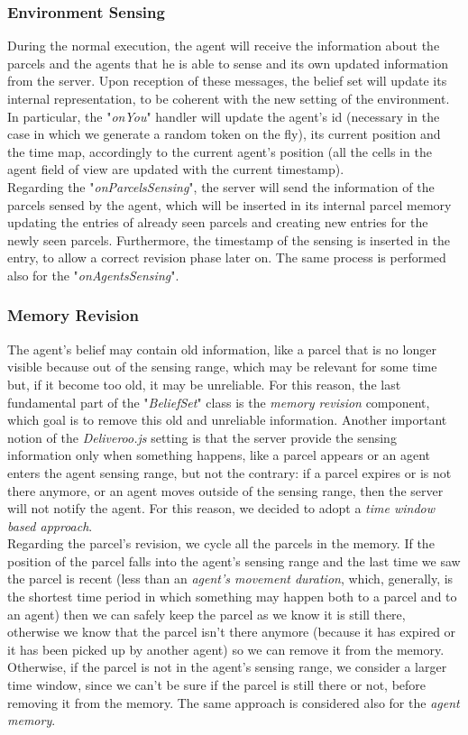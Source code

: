         \subsubsection{Environment Sensing}
            During the normal execution, the agent will receive the information about the parcels and the agents that he is able to sense and its own updated information from the server. Upon reception of these messages, the belief set will update its internal representation, to be coherent with the new setting of the environment.  In particular, the "\textit{onYou}" handler will update the agent's id (necessary in the case in which we generate a random token on the fly), its current position and the time map, accordingly to the current agent's position (all the cells in the agent field of view are updated with the current timestamp).
            \medskip\\
            Regarding the "\textit{onParcelsSensing}", the server will send the information of the parcels sensed by the agent, which will be inserted in its internal parcel memory updating the entries of already seen parcels and creating new entries for the newly seen parcels. Furthermore, the timestamp of the sensing is inserted in the entry, to allow a correct revision phase later on. The same process is performed also for the "\textit{onAgentsSensing}".

        \subsubsection{Memory Revision}
            The agent's belief may contain old information, like a parcel that is no longer visible because out of the sensing range, which may be relevant for some time but, if it become too old, it may be unreliable. For this reason, the last fundamental part of the "\textit{BeliefSet}" class is the \textit{memory revision} component, which goal is to remove this old and unreliable information. Another important notion of the \textit{Deliveroo.js} setting is that the server provide the sensing information only when something happens, like a parcel appears or an agent enters the agent sensing range, but not the contrary: if a parcel expires or is not there anymore, or an agent moves outside of the sensing range, then the server will not notify the agent. For this reason, we decided to adopt a \textit{time window based approach}.
            \medskip\\
            Regarding the parcel's revision, we cycle all the parcels in the memory. If the position of the parcel falls into the agent's sensing range and the last time we saw the parcel is recent (less than an \textit{agent's movement duration}, which, generally, is the shortest time period in which something may happen both to a parcel and to an agent) then we can safely keep the parcel as we know it is still there, otherwise we know that the parcel isn't there anymore (because it has expired or it has been picked up by another agent) so we can remove it from the memory. Otherwise, if the parcel is not in the agent's sensing range, we consider a larger time window, since we can't be sure if the parcel is still there or not, before removing it from the memory. The same approach is considered also for the \textit{agent memory}.

